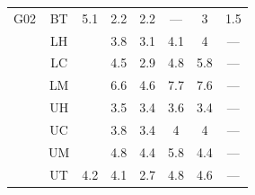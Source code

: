 \documentclass[12pt]{article}
\begin{document}
\begin{table}[]
\begin{tabular}{cccccccc}
\multirow{-8}{*}{G02} & BT & \multirow{-8}{*}{5.1} & 2.2 & 2.2 & --- & 3 & 1.5 \\
\rowcolor[HTML]{EFEFEF} 
\cellcolor[HTML]{EFEFEF} & LH & \cellcolor[HTML]{EFEFEF} & 3.8 & 3.1 & 4.1 & 4 & --- \\
\rowcolor[HTML]{EFEFEF} 
\cellcolor[HTML]{EFEFEF} & LC & \cellcolor[HTML]{EFEFEF} & 4.5 & 2.9 & 4.8 & 5.8 & --- \\
\rowcolor[HTML]{EFEFEF} 
\cellcolor[HTML]{EFEFEF} & LM & \cellcolor[HTML]{EFEFEF} & 6.6 & 4.6 & 7.7 & 7.6 & --- \\
\rowcolor[HTML]{EFEFEF} 
\cellcolor[HTML]{EFEFEF} & UH & \cellcolor[HTML]{EFEFEF} & 3.5 & 3.4 & 3.6 & 3.4 & --- \\
\rowcolor[HTML]{EFEFEF} 
\cellcolor[HTML]{EFEFEF} & UC & \cellcolor[HTML]{EFEFEF} & 3.8 & 3.4 & 4 & 4 & --- \\
\rowcolor[HTML]{EFEFEF} 
\cellcolor[HTML]{EFEFEF} & UM & \cellcolor[HTML]{EFEFEF} & 4.8 & 4.4 & 5.8 & 4.4 & --- \\
\rowcolor[HTML]{EFEFEF} 
\multirow{-7}{*}{\cellcolor[HTML]{EFEFEF}G13} & UT & \multirow{-7}{*}{\cellcolor[HTML]{EFEFEF}4.2} & 4.1 & 2.7 & 4.8 & 4.6 & ---
\end{tabular}
\end{table}
\end{document}
